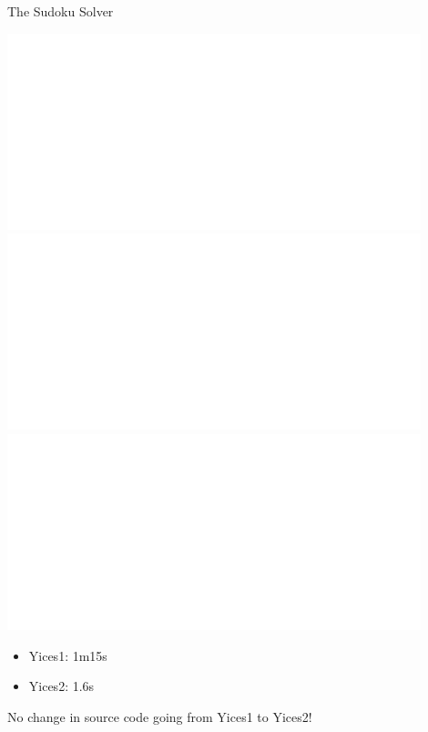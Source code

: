 \documentclass{beamer}
\begin{document}
\begin{frame}{The Sudoku Solver}
\begin{overprint}
 \includegraphics[width=0.9\textwidth]{main1}
 \includegraphics[width=0.9\textwidth]{main2}
 \includegraphics[width=0.9\textwidth]{main3}
\end{overprint}
\begin{itemize}
\item Yices1: 1m15s
\item Yices2: 1.6s
\end{itemize}
\alert{No change in source code going from Yices1 to Yices2!}
\end{frame}
\end{document}
